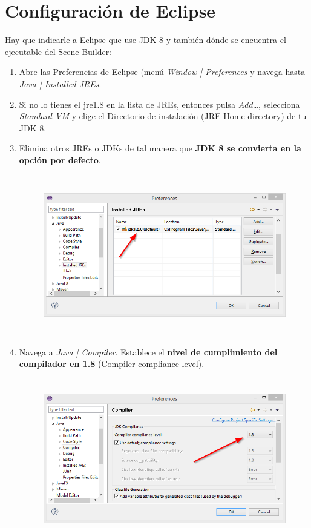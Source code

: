 \section{Configuración de Eclipse}
Hay que indicarle a Eclipse que use JDK 8 y también dónde se encuentra el ejecutable del Scene Builder:
\begin{enumerate}
	\item Abre las Preferencias de Eclipse (menú\textit{ Window | Preferences} y navega hasta \textit{Java | Installed JREs}.
	\item Si no lo tienes el jre1.8 en la lista de JREs, entonces pulsa \textit{Add}…, selecciona \textit{Standard VM} y elige el Directorio de instalación (JRE Home directory) de tu JDK 8.
	\item Elimina otros JREs o JDKs de tal manera que \textbf{JDK 8 se convierta en la opción por defecto}.
	\begin{figure}[H]
		\includegraphics[height=7cm]{img/preferences-jdk}
	\end{figure}
	\item Navega a \textit{Java | Compiler}. Establece el \textbf{nivel de cumplimiento del compilador en 1.8} (Compiler compliance level).
	\begin{figure}[H]
		\includegraphics[height=7cm]{img/preferences-compliance}

\end{figure}
\end{enumerate}
